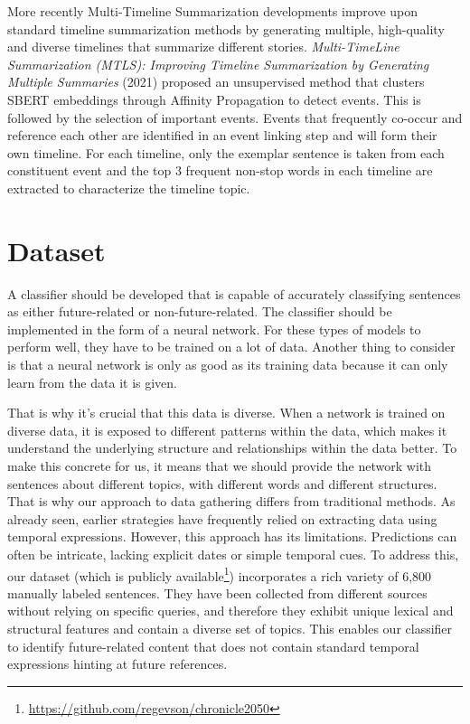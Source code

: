 \documentclass[a4paper,10pt]{report} %
\begin{document}
More recently Multi-Timeline Summarization developments improve upon standard timeline summarization methods by generating multiple, high-quality and diverse timelines that summarize different stories. \textit{Multi-TimeLine Summarization (MTLS): Improving Timeline Summarization by Generating Multiple Summaries} (2021) \cite{YuMultiTimeline} proposed an unsupervised method that clusters SBERT embeddings through Affinity Propagation to detect events. This is followed by the selection of important events. Events that frequently co-occur and reference each other are identified in an event linking step and will form their own timeline. For each timeline, only the exemplar sentence is taken from each constituent event and the top 3 frequent non-stop words in each timeline are extracted to characterize the timeline topic.



\chapter{Dataset}
A classifier should be developed that is capable of accurately classifying sentences as either future-related or non-future-related. The classifier should be implemented in the form of a neural network. For these types of models to perform well, they have to be trained on a lot of data. Another thing to consider is that a neural network is only as good as its training data because it can only learn from the data it is given. 

That is why it's crucial that this data is diverse. When a network is trained on diverse data, it is exposed to different patterns within the data, which makes it understand the underlying structure and relationships within the data better. \cite{GoodfellowDeepLearning} To make this concrete for us, it means that we should provide the network with sentences about different topics, with different words and different structures. That is why our approach to data gathering differs from traditional methods. As already seen, earlier strategies have frequently relied on extracting data using temporal expressions. However, this approach has its limitations. Predictions can often be intricate, lacking explicit dates or simple temporal cues. To address this, our dataset (which is publicly available\footnote{\url{https://github.com/regevson/chronicle2050}}) incorporates a rich variety of 6,800 manually labeled sentences. They have been collected from different sources without relying on specific queries, and therefore they exhibit unique lexical and structural features and contain a diverse set of topics. This enables our classifier to identify future-related content that does not contain standard temporal expressions hinting at future references.
\end{document}
